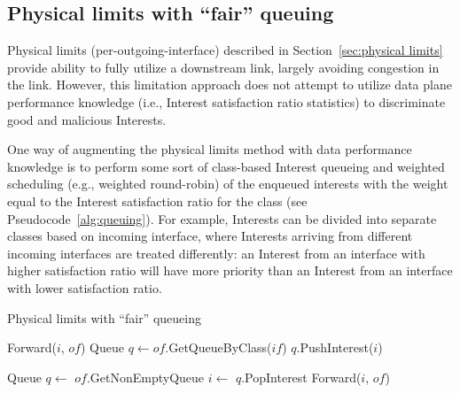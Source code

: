 \subsection{Physical limits with ``fair'' queuing}
\label{sec:queuing}

Physical limits (per-outgoing-interface) described in Section~\ref{sec:physical limits} provide ability to fully utilize a downstream link, largely avoiding congestion in the link.
However, this limitation approach does not attempt to utilize data plane performance knowledge (i.e., Interest satisfaction ratio statistics) to discriminate good and malicious Interests.

One way of augmenting the physical limits method with data performance knowledge is to perform some sort of class-based Interest queueing and weighted scheduling (e.g., weighted round-robin) of the enqueued interests with the weight equal to the Interest satisfaction ratio for the class (see Pseudocode~\ref{alg:queuing}).
For example, Interests can be divided into separate classes based on incoming interface, where Interests arriving from different incoming interfaces are treated differently:
an Interest from an interface with higher satisfaction ratio will have more priority than an Interest from an interface with lower satisfaction ratio.



\begin{algorithm}[h]
\caption{Physical limits with ``fair'' queueing}
\label{alg:queuing}
\begin{algorithmic}[1]
        \State Forward($i$, $of$)
    \Else
        \State Queue $q \leftarrow of$.GetQueueByClass($if$)
        \State $q$.PushInterest($i$)
    \EndIf
\EndFor
\EndFunction

\vspace{0.2cm}
\State{} 
    \State{} 
    \State Queue $q \leftarrow$ $of$.GetNonEmptyQueue 
    \State $i \leftarrow$ $q$.PopInterest
    \State Forward($i$, $of$)
\EndFunction
\end{algorithmic}
\end{algorithm}


